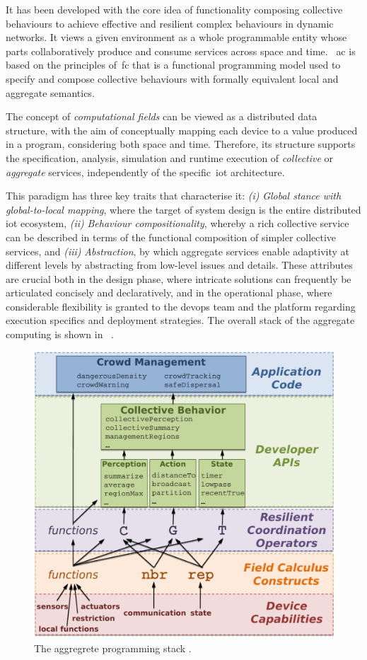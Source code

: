 It has been developed with the core idea of functionality composing collective behaviours to achieve effective and resilient
complex behaviours in dynamic networks.
It views a given environment as a whole programmable entity whose parts collaboratively produce and consume services
across space and time.
~\ac{ac} is based on the principles of~\ac{fc} that is a functional programming model used to specify
and compose collective behaviours with formally equivalent local and aggregate semantics.

The concept of \emph{computational fields} can be viewed as a distributed data structure,
with the aim of conceptually mapping each device to a value produced in a program, considering both
space and time.
Therefore, its structure supports the specification, analysis, simulation and runtime execution of \emph{collective}
or \emph{aggregate} services, independently of the specific~\ac{iot} architecture.

This paradigm has three key traits that characterise it:
    \emph{(i)} \emph{Global stance with global-to-local mapping}, where the target of system design is the entire distributed
        \ac{iot} ecosystem,
    \emph{(ii)} \emph{Behaviour compositionality}, whereby a rich collective service can be described in terms of the functional
        composition of simpler collective services, and
    \emph{(iii)} \emph{Abstraction}, by which aggregate services enable adaptivity at different levels by abstracting from low-level
        issues and details.
These attributes are crucial both in the design phase, where intricate solutions can frequently be articulated concisely
and declaratively, and in the operational phase, where considerable flexibility is granted to the devops team and the
platform regarding execution specifics and deployment strategies.
The overall stack of the aggregate computing is shown in ~.

\begin{figure}
    \centering
    \includegraphics[width=.7\linewidth]{figures/aggregate-programming-stack}
    \caption{The aggregrete programming stack \cite{7274429}.}
    \label{fig:ac-stack}
\end{figure}

